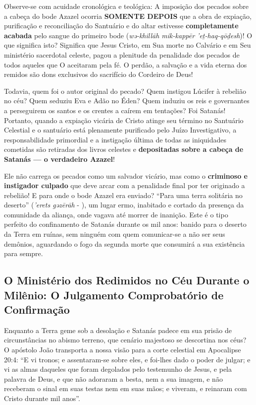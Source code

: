 Observe-se com acuidade cronológica e teológica:
A imposição dos pecados sobre a cabeça do bode Azazel ocorria \textbf{SOMENTE DEPOIS} que a obra de expiação, purificação e reconciliação do Santuário e do altar estivesse \textbf{completamente acabada} pelo sangue do primeiro bode (\textit{wə-khillāh mik-kappēr ’eṯ-haq-qōḏesh})!
O que significa isto?
Significa que Jesus Cristo, em Sua morte no Calvário e em Seu ministério sacerdotal celeste, pagou a plenitude da penalidade dos pecados de todos aqueles que O aceitaram pela fé. O perdão, a salvação e a vida eterna dos remidos são dons exclusivos do sacrifício do Cordeiro de Deus!

Todavia, quem foi o autor original do pecado? Quem instigou Lúcifer à rebelião no céu? Quem seduziu Eva e Adão no Éden? Quem induziu os reis e governantes a perseguirem os santos e os crentes a caírem em tentações? Foi Satanás!
Portanto, quando a expiação vicária de Cristo atinge seu término no Santuário Celestial e o santuário está plenamente purificado pelo Juízo Investigativo, a responsabilidade primordial e a instigação última de todas as iniquidades cometidas são retiradas dos livros celestes e \textbf{depositadas sobre a cabeça de Satanás — o verdadeiro Azazel}!

Ele não carrega os pecados como um salvador vicário, mas como o \textbf{criminoso e instigador culpado} que deve arcar com a penalidade final por ter originado a rebelião!
E para onde o bode Azazel era enviado? ``Para uma terra solitária no deserto'' (\textit{’erets gəzērāh} - ), um lugar ermo, inabitado e cortado da presença da comunidade da aliança, onde vagava até morrer de inanição.
Este é o tipo perfeito do confinamento de Satanás durante os mil anos: banido para o deserto da Terra em ruínas, sem ninguém com quem comunicar-se a não ser seus demônios, aguardando o fogo da segunda morte que consumirá a sua existência para sempre.



\subsection{O Ministério dos Redimidos no Céu Durante o Milênio: O Julgamento Comprobatório de Confirmação}


Enquanto a Terra geme sob a desolação e Satanás padece em sua prisão de circunstâncias no abismo terreno, que cenário majestoso se descortina nos céus?
O apóstolo João transporta a nossa visão para a corte celestial em Apocalipse 20:4:
``E vi tronos; e assentaram-se sobre eles, e foi-lhes dado o poder de julgar; e vi as almas daqueles que foram degolados pelo testemunho de Jesus, e pela palavra de Deus, e que não adoraram a besta, nem a sua imagem, e não receberam o sinal em suas testas nem em suas mãos; e viveram, e reinaram com Cristo durante mil anos''.

